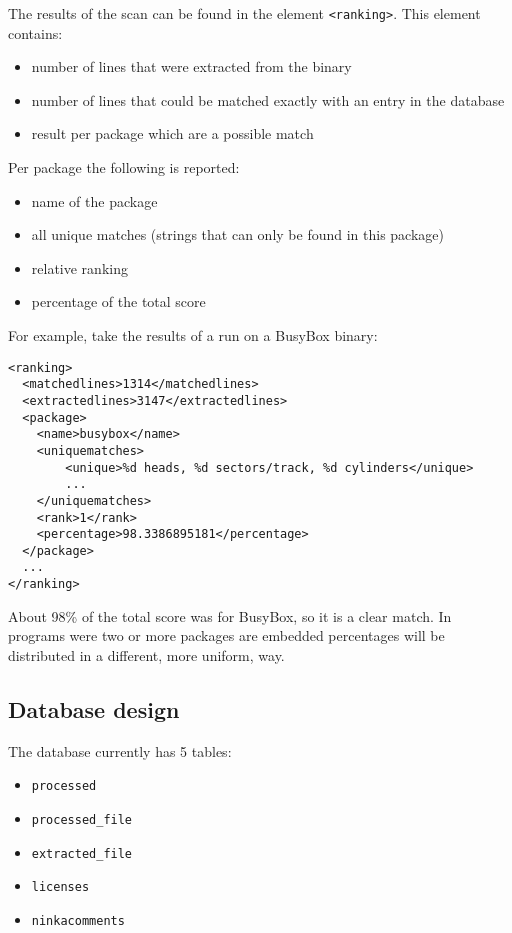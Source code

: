 \documentclass[10pt]{article}
\begin{document}
The results of the scan can be found in the element \texttt{<ranking>}. This
element contains:

\begin{itemize}
\item number of lines that were extracted from the binary
\item number of lines that could be matched exactly with an entry in the
database
\item result per package which are a possible match
\end{itemize}

Per package the following is reported:

\begin{itemize}
\item name of the package
\item all unique matches (strings that can only be found in this package)
\item relative ranking
\item percentage of the total score
\end{itemize}

For example, take the results of a run on a BusyBox binary:

\begin{verbatim}
<ranking>
  <matchedlines>1314</matchedlines>
  <extractedlines>3147</extractedlines>
  <package>
    <name>busybox</name>
    <uniquematches>
        <unique>%d heads, %d sectors/track, %d cylinders</unique>
        ...
    </uniquematches>
    <rank>1</rank>
    <percentage>98.3386895181</percentage>
  </package>
  ...
</ranking>
\end{verbatim}

About 98\% of the total score was for BusyBox, so it is a clear match. In
programs were two or more packages are embedded percentages will be distributed
in a different, more uniform, way.

\subsection{Database design}

The database currently has 5 tables:

\begin{itemize}
\item \texttt{processed}
\item \texttt{processed\_file}
\item \texttt{extracted\_file}
\item \texttt{licenses}
\item \texttt{ninkacomments}
\end{itemize}
\end{document}
